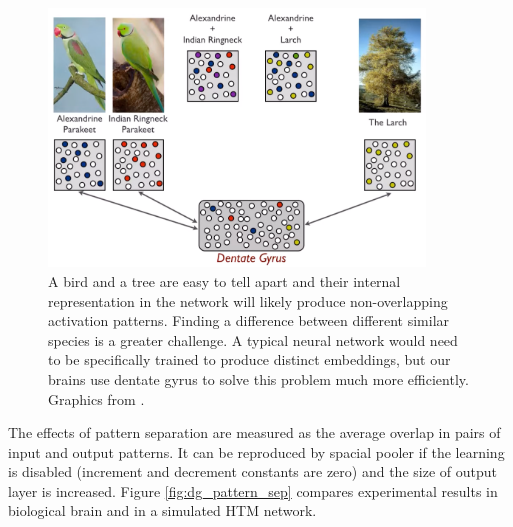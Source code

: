 \documentclass[12pt]{article}
\begin{document}
\begin{figure}[!htbp]
	\centering
	\includegraphics[width=10cm]{pattern_sep}
	\caption{A bird and a tree are easy to tell apart and their internal representation in the network will likely produce non-overlapping activation patterns. Finding a difference between different similar species is a greater challenge. A typical neural network would need to be specifically trained to produce distinct embeddings, but our brains use dentate gyrus to solve this problem much more efficiently. Graphics from \cite{pattern_sep}.}
	\label{fig:pattern_sep}
\end{figure}

The effects of pattern separation are measured as the average overlap in pairs of input and output patterns. It can be reproduced by spacial pooler\cite{spacial_pooler} if the learning is disabled (increment and decrement constants are zero) and the size of output layer is increased. Figure \ref{fig:dg_pattern_sep} compares experimental results in biological brain and in a simulated HTM network.
\end{document}

